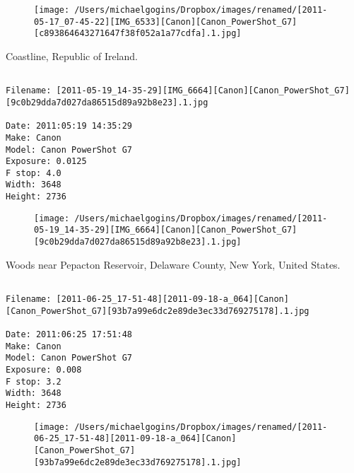 \documentclass[11pt,letter,DIV=14,paper=landscape]{scrbook}
\begin{document}
\begin{figure}
\texttt{[image: /Users/michaelgogins/Dropbox/images/renamed/[2011-05-17\_07-45-22][IMG\_6533][Canon][Canon\_PowerShot\_G7][c893864643271647f38f052a1a77cdfa].1.jpg]}
\end{figure}
    
\clearpage
\noindent Coastline, Republic of Ireland.
\noindent
\begin{lstlisting}

Filename: [2011-05-19_14-35-29][IMG_6664][Canon][Canon_PowerShot_G7][9c0b29dda7d027da86515d89a92b8e23].1.jpg

Date: 2011:05:19 14:35:29
Make: Canon
Model: Canon PowerShot G7
Exposure: 0.0125
F stop: 4.0
Width: 3648
Height: 2736
\end{lstlisting}
\clearpage

\begin{figure}
\texttt{[image: /Users/michaelgogins/Dropbox/images/renamed/[2011-05-19\_14-35-29][IMG\_6664][Canon][Canon\_PowerShot\_G7][9c0b29dda7d027da86515d89a92b8e23].1.jpg]}
\end{figure}
    
\clearpage
\noindent Woods near Pepacton Reservoir, Delaware County, New York, United States.
\noindent
\begin{lstlisting}

Filename: [2011-06-25_17-51-48][2011-09-18-a_064][Canon][Canon_PowerShot_G7][93b7a99e6dc2e89de3ec33d769275178].1.jpg

Date: 2011:06:25 17:51:48
Make: Canon
Model: Canon PowerShot G7
Exposure: 0.008
F stop: 3.2
Width: 3648
Height: 2736
\end{lstlisting}
\clearpage

\begin{figure}
\texttt{[image: /Users/michaelgogins/Dropbox/images/renamed/[2011-06-25\_17-51-48][2011-09-18-a\_064][Canon][Canon\_PowerShot\_G7][93b7a99e6dc2e89de3ec33d769275178].1.jpg]}
\end{figure}
    
\end{document}
